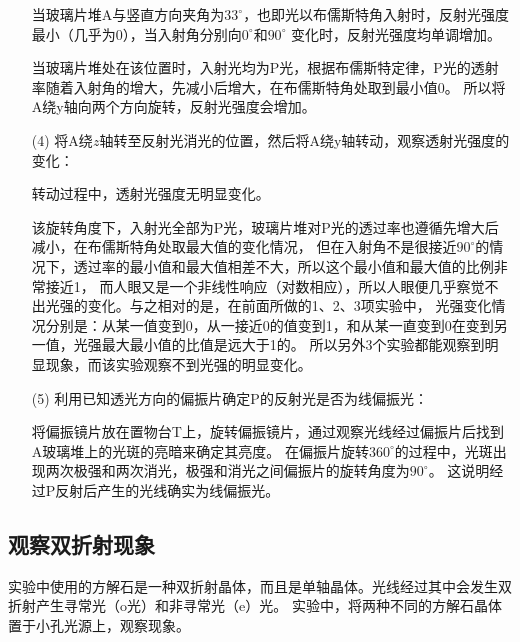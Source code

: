 \documentclass{article}
\newcommand{\degree}{^\circ}
\begin{document}
\begin{enumerate}
        当玻璃片堆A与竖直方向夹角为$33\degree$，也即光以布儒斯特角入射时，反射光强度最小（几乎为0），当入射角分别向$0\degree$和$90\degree$
        变化时，反射光强度均单调增加。

        当玻璃片堆处在该位置时，入射光均为P光，根据布儒斯特定律，P光的透射率随着入射角的增大，先减小后增大，在布儒斯特角处取到最小值0。
        所以将A绕y轴向两个方向旋转，反射光强度会增加。

        \item [(4)]
        将A绕$z$轴转至反射光消光的位置，然后将A绕y轴转动，观察透射光强度的变化：

        转动过程中，透射光强度无明显变化。

        该旋转角度下，入射光全部为P光，玻璃片堆对P光的透过率也遵循先增大后减小，在布儒斯特角处取最大值的变化情况，
        但在入射角不是很接近$90\degree$的情况下，透过率的最小值和最大值相差不大，所以这个最小值和最大值的比例非常接近1，
        而人眼又是一个非线性响应（对数相应），所以人眼便几乎察觉不出光强的变化。与之相对的是，在前面所做的1、2、3项实验中，
        光强变化情况分别是：从某一值变到0，从一接近0的值变到1，和从某一直变到0在变到另一值，光强最大最小值的比值是远大于1的。
        所以另外3个实验都能观察到明显现象，而该实验观察不到光强的明显变化。

        \item [(5)]
        利用已知透光方向的偏振片确定P的反射光是否为线偏振光：

        将偏振镜片放在置物台T上，旋转偏振镜片，通过观察光线经过偏振片后找到A玻璃堆上的光斑的亮暗来确定其亮度。
        在偏振片旋转$360\degree$的过程中，光斑出现两次极强和两次消光，极强和消光之间偏振片的旋转角度为$90\degree$。
        这说明经过P反射后产生的光线确实为线偏振光。
    \end{enumerate}

    \subsection{观察双折射现象}
    实验中使用的方解石是一种双折射晶体，而且是单轴晶体。光线经过其中会发生双折射产生寻常光（o光）和非寻常光（e）光。
    实验中，将两种不同的方解石晶体置于小孔光源上，观察现象。
\end{document}
